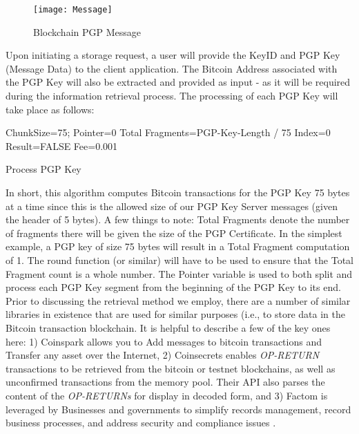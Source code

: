 \documentclass{llncs}
\begin{document}
\begin{figure}[h]
  \centering \texttt{[image: Message]}
  \caption{Blockchain PGP Message}
\end{figure}

Upon initiating a storage request, a user will provide the KeyID and PGP Key (Message Data) to the client application.  The Bitcoin Address associated with the PGP Key will also be extracted and provided as input - as it will be required during the information retrieval process.  The processing of each PGP Key will take place as follows: 
\begin{algorithm}
 ChunkSize=75; Pointer=0\;
 Total Fragments=PGP-Key-Length / 75\;
 Index=0\;
 Result=FALSE\;
 Fee=0.001\;
 \caption{Process PGP Key}
\end{algorithm}

In short, this algorithm computes Bitcoin transactions for the PGP Key 75 bytes at a time since this is the allowed size of our PGP Key Server messages (given the header of 5 bytes).  A few things to note: Total Fragments denote the number of fragments there will be given the size of the PGP Certificate.  In the simplest example, a PGP key of size 75 bytes will result in a Total Fragment computation of 1.  The round function (or similar) will have to be used to ensure that the Total Fragment count is a whole number.  The Pointer variable is used to both split and process each PGP Key segment from the beginning of the PGP Key to its end.  Prior to discussing the retrieval method we employ, there are a number of similar libraries in existence that are used for similar purposes (i.e., to store data in the Bitcoin transaction blockchain.  It is helpful to describe a few of the key ones here: 1) Coinspark allows you to Add messages to bitcoin transactions and Transfer any asset over the Internet, 2) Coinsecrets enables \textit{OP-RETURN} transactions to be retrieved from the bitcoin or testnet blockchains, as well as unconfirmed transactions from the memory pool. Their API also parses the content of the \textit{OP-RETURNs} for display in decoded form, and 3) Factom is leveraged by Businesses and governments to simplify records management, record business processes, and address security and compliance issues \cite {coinspark,coinsecrets,factom}.
\end{document}
